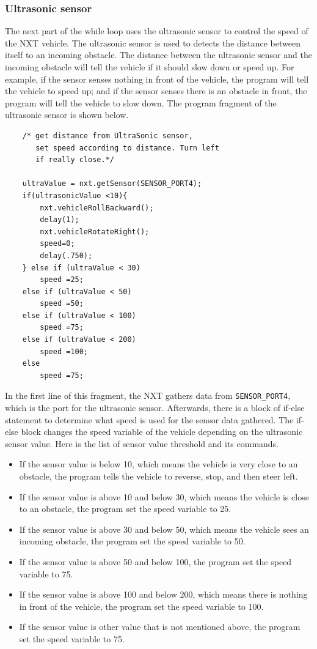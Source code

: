 \subsubsection*{Ultrasonic sensor}
The next part of the while loop uses the ultrasonic sensor to control the speed of the NXT vehicle.
The ultrasonic sensor is used to detects the distance between itself to an incoming obstacle.
The distance between the ultrasonic sensor and the incoming obstacle will tell the vehicle if it should slow down or
    speed up.
For example, if the sensor senses nothing in front of the vehicle, the program will tell the vehicle to speed up; and
if the sensor senses there is an obstacle in front, the program will tell the vehicle to slow down.
The program fragment of the ultrasonic sensor is shown below.
\begin{verbatim}
    /* get distance from UltraSonic sensor, 
       set speed according to distance. Turn left 
       if really close.*/
       
    ultraValue = nxt.getSensor(SENSOR_PORT4);
    if(ultrasonicValue <10){
        nxt.vehicleRollBackward();
        delay(1);
        nxt.vehicleRotateRight();
        speed=0;
        delay(.750);
    } else if (ultraValue < 30)	
        speed =25;
    else if (ultraValue < 50)
        speed =50;
    else if (ultraValue < 100)	
        speed =75;
    else if (ultraValue < 200)
        speed =100;
    else
        speed =75;
\end{verbatim}
In the first line of this fragment, the NXT gathers data from \verb+SENSOR_PORT4+, which is the port for the ultrasonic sensor.
Afterwards, there is a block of if-else statement to determine what speed is used for the sensor data gathered.
The if-else block changes the speed variable of the vehicle depending on the ultrasonic sensor value.
Here is the list of sensor value threshold and its commands.
\begin{itemize}
\item If the sensor value is below 10, which means the vehicle is very close to an obstacle, the program tells the
    vehicle to reverse, stop, and then steer left.
\item If the sensor value is above 10 and below 30, which means the vehicle is close to an obstacle, the
    program set the speed variable to 25.
\item If the sensor value is above 30 and below 50, which means the vehicle sees an incoming obstacle, the
    program set the speed variable to 50.
\item If the sensor value is above 50 and below 100, the program set the speed variable to 75.
\item If the sensor value is above 100 and below 200, which means there is nothing in front of the vehicle,
    the program set the speed variable to 100.
\item If the sensor value is other value that is not mentioned above, the program set the speed variable to 75.
\end{itemize}


